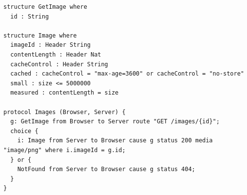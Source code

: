 \begin{lstlisting}[language={},basicstyle=\ttfamily\footnotesize,breaklines=true]
structure GetImage where
  id : String

structure Image where
  imageId : Header String
  contentLength : Header Nat
  cacheControl : Header String
  cached : cacheControl = "max-age=3600" or cacheControl = "no-store"
  small : size <= 5000000
  measured : contentLength = size

protocol Images (Browser, Server) {
  g: GetImage from Browser to Server route "GET /images/{id}";
  choice {
    i: Image from Server to Browser cause g status 200 media "image/png" where i.imageId = g.id;
  } or {
    NotFound from Server to Browser cause g status 404;
  }
}
\end{lstlisting}
